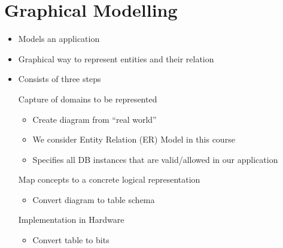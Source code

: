 
\section{Graphical Modelling}
\begin{itemize}
    \item Models an application
    \item Graphical way to represent entities and their relation
    \item Consists of three steps
        \begin{itemize}
             Capture of domains to be represented
                \begin{itemize}
                    \item Create diagram from ``real world''
                    \item We consider Entity Relation (ER) Model in this course
                    \item Specifies all DB instances that are valid/allowed in our application
                \end{itemize}
             Map concepts to a concrete logical representation
                \begin{itemize}
                    \item Convert diagram to table schema
                \end{itemize}
             Implementation in Hardware
                \begin{itemize}
                    \item Convert table to bits
                \end{itemize}
        \end{itemize}
\end{itemize}

